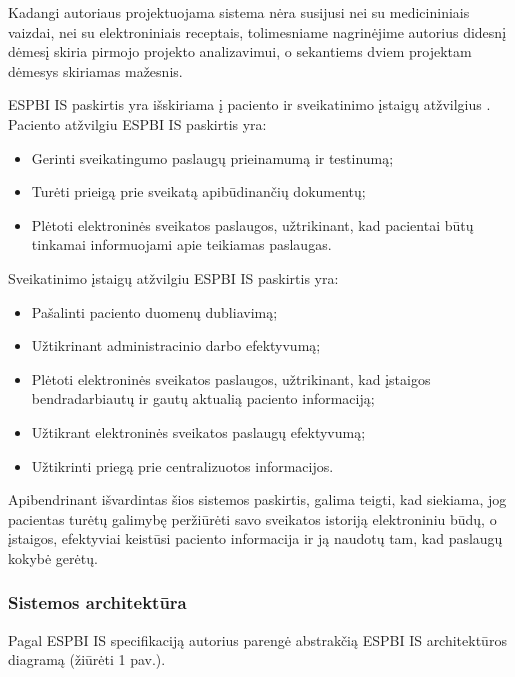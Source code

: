 Kadangi autoriaus projektuojama sistema nėra susijusi nei su medicininiais vaizdai, nei su elektroniniais receptais, tolimesniame nagrinėjime autorius didesnį dėmesį skiria pirmojo projekto analizavimui, o sekantiems dviem projektam dėmesys skiriamas mažesnis.


ESPBI IS paskirtis yra išskiriama į paciento ir sveikatinimo įstaigų atžvilgius \cite{Ltrsam}. Paciento atžvilgiu ESPBI IS paskirtis yra:
\begin{itemize}
    \item Gerinti sveikatingumo paslaugų prieinamumą ir testinumą;
    \item Turėti prieigą prie sveikatą apibūdinančių dokumentų;
    \item Plėtoti elektroninės sveikatos paslaugos, užtrikinant, kad pacientai būtų tinkamai informuojami apie teikiamas paslaugas.
\end{itemize}


Sveikatinimo įstaigų atžvilgiu ESPBI IS paskirtis yra:
\begin{itemize}
    \item Pašalinti paciento duomenų dubliavimą;
    \item Užtikrinant administracinio darbo efektyvumą;
    \item Plėtoti elektroninės sveikatos paslaugos, užtrikinant, kad įstaigos bendradarbiautų ir gautų aktualią paciento informaciją;
    \item Užtikrant elektroninės sveikatos paslaugų efektyvumą;
    \item Užtikrinti priegą prie centralizuotos informacijos.
\end{itemize}

Apibendrinant išvardintas šios sistemos paskirtis, galima teigti, kad siekiama, jog pacientas turėtų galimybę peržiūrėti savo sveikatos istoriją elektroniniu būdų, o įstaigos, efektyviai keistūsi paciento informacija ir ją naudotų tam, kad paslaugų kokybė gerėtų.

\subsubsection{Sistemos architektūra}

Pagal ESPBI IS specifikaciją \cite{Specifikacija} autorius parengė abstrakčią ESPBI IS architektūros diagramą (žiūrėti 1 pav.). 

